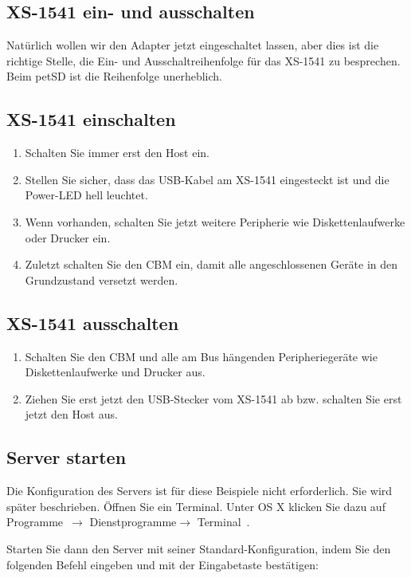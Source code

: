 \documentclass[10pt,a4paper]{scrartcl}		%
\begin{document}
\subsection{XS-1541 ein- und ausschalten}
Natürlich wollen wir den Adapter jetzt eingeschaltet lassen, aber dies
ist die richtige Stelle, die Ein- und Ausschaltreihenfolge für das
XS-1541 zu besprechen. Beim petSD ist die Reihenfolge unerheblich.

\subsection*{XS-1541 einschalten}
\begin{enumerate}
\item Schalten Sie immer erst den Host ein. 
\item Stellen Sie sicher, dass das USB-Kabel am XS-1541 eingesteckt ist und 
die Power-LED hell leuchtet.
\item Wenn vorhanden, schalten Sie jetzt weitere Peripherie wie 
Diskettenlaufwerke oder Drucker ein.
\item Zuletzt schalten Sie den CBM ein, damit alle angeschlossenen
Geräte in den Grundzustand versetzt werden.
\end{enumerate}

\subsection*{XS-1541 ausschalten}
\begin{enumerate}
\item Schalten Sie den CBM und alle am Bus hängenden Peripheriegeräte
wie Diskettenlaufwerke und Drucker aus.
\item Ziehen Sie erst jetzt den USB-Stecker vom XS-1541 ab bzw.
schalten Sie erst jetzt den Host aus.
\end{enumerate}

\subsection{Server starten}

Die Konfiguration des Servers ist für diese Beispiele nicht erforderlich.
Sie wird später beschrieben.
Öffnen Sie ein Terminal. Unter OS X klicken Sie dazu auf \glqq Programme\grqq\  
$\to$ \glqq Dienstprogramme\grqq $\to$ \glqq Terminal\grqq\ .

Starten Sie dann den Server mit seiner Standard-Konfiguration, indem Sie
den folgenden Befehl eingeben und mit der Eingabetaste bestätigen:
\end{document}
